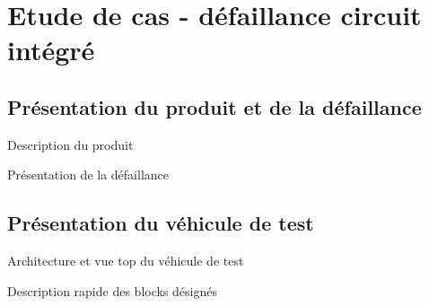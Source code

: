 \chapter{Etude de cas - défaillance circuit intégré}

\section{Présentation du produit et de la défaillance}

Description du produit

Présentation de la défaillance

\section{Présentation du véhicule de test}

Architecture et vue top du véhicule de test

Description rapide des blocks désignés
